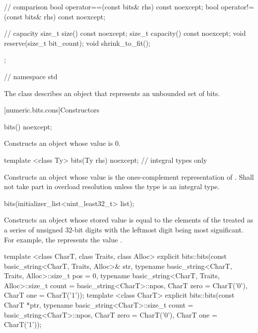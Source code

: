 \begin{codeblock}
{{    // comparison
    bool operator==(const bits& rhs) const noexcept;
    bool operator!=(const bits& rhs) const noexcept;
    
    // capacity
    size_t size() const noexcept;
    size_t capacity() const noexcept;
    void reserve(size_t bit_count);
    void shrink_to_fit();  
  };
} // namespace std
\end{codeblock}

The class describes an object that represents an unbounded set of bits.

[numeric.bits.cons]{Constructors}

\begin{itemdecl}
bits() noexcept;
\end{itemdecl}

\begin{itemdescr}
\effects Constructs an object whose value is 0.
\end{itemdescr}

\begin{itemdecl}
template <class Ty>
  bits(Ty rhs) noexcept;    // integral types only
\end{itemdecl}

\begin{itemdescr}
\effects Constructs an object whose value is the ones-complement representation of . Shall not take part in overload resolution unless the type  is an integral type.
\end{itemdescr}

\begin{itemdecl}
bits(initializer_list<uint_least32_t> list);
\end{itemdecl}

\begin{itemdescr}
\effects Constructs an object whose stored value is equal to the elements of the  treated as a series of unsigned 32-bit digits with the leftmost digit being most significant. For example, the  represents the value .
\end{itemdescr}

\begin{itemdecl}
template <class CharT, class Traits, class Alloc>
  explicit bits::bits(const basic_string<CharT, Traits, Alloc>& str,
                      typename basic_string<CharT, Traits, Alloc>::size_t pos = 0,
                      typename basic_string<CharT, Traits, Alloc>::size_t count = basic_string<CharT>::npos,
                      CharT zero = CharT('0'),
                      CharT one = CharT('1'));
template <class CharT>
  explicit bits::bits(const CharT *ptr,
                      typename basic_string<CharT>::size_t count = basic_string<CharT>::npos,
                      CharT zero = CharT('0'),
                      CharT one = CharT('1'));                      
\end{itemdecl}

